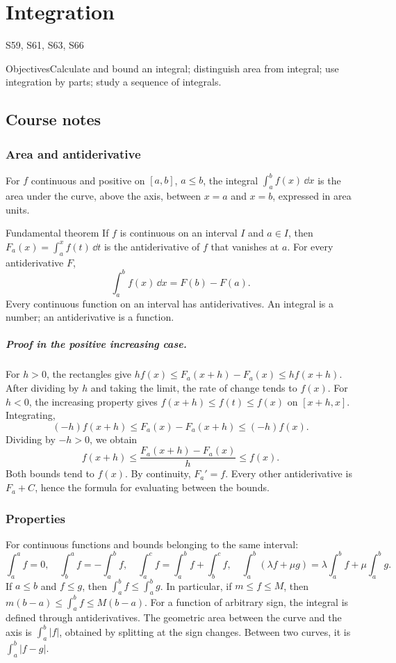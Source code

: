 \setcounter{chapter}{7}\chapter{Integration}\label{ch:8}

{\small\sffamily\color{teal}S59, S61, S63, S66\par}

\begin{retenir}{Objectives}Calculate and bound an integral; distinguish area from integral; use integration by parts; study a sequence of integrals.\end{retenir}

\section{Course notes}
\subsection{Area and antiderivative}
For $f$ continuous and positive on $[a,b]$, $a\le b$, the integral $\int_a^b f(x)\,\dd x$ is the area under the curve, above the axis, between $x=a$ and $x=b$, expressed in area units.
\begin{retenir}{Fundamental theorem}
If $f$ is continuous on an interval $I$ and $a\in I$, then $F_a(x)=\int_a^x f(t)\,\dd t$ is the antiderivative of $f$ that vanishes at $a$. For every antiderivative $F$,
\[\int_a^b f(x)\,\dd x=F(b)-F(a).\]
Every continuous function on an interval has antiderivatives. An integral is a number; an antiderivative is a function.
\end{retenir}
\paragraph{Proof in the positive increasing case.} For $h>0$, the rectangles give $hf(x)\le F_a(x+h)-F_a(x)\le hf(x+h)$. After dividing by $h$ and taking the limit, the rate of change tends to $f(x)$. For $h<0$, the increasing property gives $f(x+h)\le f(t)\le f(x)$ on $[x+h,x]$. Integrating,
\[(-h)f(x+h)\le F_a(x)-F_a(x+h)\le(-h)f(x).\]
Dividing by $-h>0$, we obtain
\[f(x+h)\le\frac{F_a(x+h)-F_a(x)}h\le f(x).\]
Both bounds tend to $f(x)$. By continuity, $F_a'=f$. Every other antiderivative is $F_a+C$, hence the formula for evaluating between the bounds.
\subsection{Properties}
For continuous functions and bounds belonging to the same interval:
\[\int_a^a f=0,\quad\int_b^a f=-\int_a^b f,\quad
\int_a^c f=\int_a^b f+\int_b^c f,\quad
\int_a^b(\lambda f+\mu g)=\lambda\int_a^b f+\mu\int_a^b g.\]
If $a\le b$ and $f\le g$, then $\int_a^b f\le\int_a^b g$. In particular, if $m\le f\le M$, then $m(b-a)\le\int_a^b f\le M(b-a)$.
For a function of arbitrary sign, the integral is defined through antiderivatives. The geometric area between the curve and the axis is $\int_a^b|f|$, obtained by splitting at the sign changes. Between two curves, it is $\int_a^b|f-g|$.
